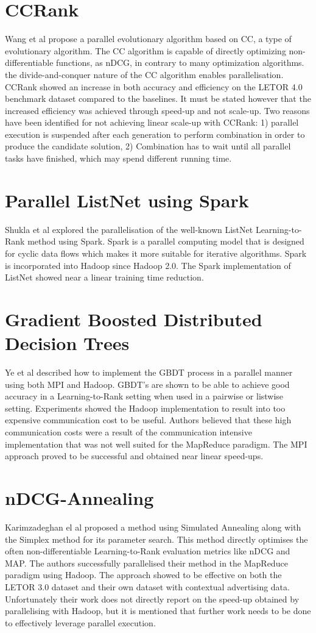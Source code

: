 \section{CCRank}
Wang et al\cite{Wang2011a,Wang2011b} propose a parallel evolutionary algorithm based on \ac{CC}, a type of evolutionary algorithm. The \ac{CC} algorithm is capable of directly optimizing non-differentiable functions, as \ac{nDCG}, in contrary to many optimization algorithms.  the divide-and-conquer nature of the \ac{CC} algorithm enables parallelisation. CCRank showed an increase in both accuracy and efficiency on the LETOR 4.0 benchmark dataset compared to the baselines. It must be stated however that the increased efficiency was achieved through speed-up and not scale-up. Two reasons have been identified for not achieving linear scale-up with CCRank: 1) parallel execution is suspended after each generation to perform combination in order to produce the candidate solution, 2) Combination has to wait until all parallel tasks have finished, which may spend different running time.
\section{Parallel ListNet using Spark}
Shukla et al\cite{Shukla2012} explored the parallelisation of the well-known ListNet Learning-to-Rank method using Spark. Spark is a parallel computing model that is designed for cyclic data flows which makes it more suitable for iterative algorithms. Spark is incorporated into Hadoop since Hadoop 2.0. The Spark implementation of ListNet showed near a linear training time reduction.
\section{Gradient Boosted Distributed Decision Trees}
Ye et al\cite{Ye2009} described how to implement the \ac{GBDT} process in a parallel manner using both MPI and Hadoop. \ac{GBDT}'s are shown to be able to achieve good accuracy in a Learning-to-Rank setting when used in a pairwise\cite{Zheng2007} or listwise\cite{Chen2008} setting. Experiments showed the Hadoop implementation to result into too expensive communication cost to be useful. Authors believed that these high communication costs were a result of the communication intensive implementation that was not well suited for the MapReduce paradigm. The MPI approach proved to be successful and obtained near linear speed-ups.
\section{nDCG-Annealing}
Karimzadeghan el al\cite{Karimzadehgan2011} proposed a method using Simulated Annealing along with the Simplex method for its parameter search. This method directly optimises the often non-differentiable Learning-to-Rank evaluation metrics like \ac{nDCG} and \ac{MAP}. The authors successfully parallelised their method in the MapReduce paradigm using Hadoop. The approach showed to be effective on both the LETOR 3.0 dataset and their own dataset with contextual advertising data. Unfortunately their work does not directly report on the speed-up obtained by parallelising  with Hadoop, but it is mentioned that further work needs to be done to effectively leverage parallel execution.
